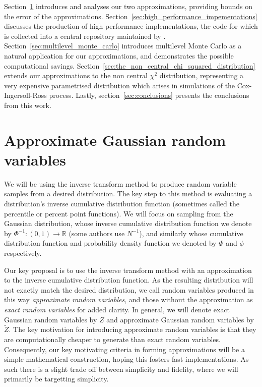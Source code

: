 \documentclass[manuscript,review]{acmart}
\begin{document}
Section~\ref{sec:approximate_gaussian_random_variables} introduces and analyses our two approximations, providing bounds on the error of the approximations. Section~\ref{sec:high_performance_impementations} discusses the production of high performance implementations, the code for which is collected into a central repository maintained by \citet{sheridan2020approximate_random,sheridan2020approximate_inverse}. Section~\ref{sec:multilevel_monte_carlo} introduces multilevel Monte Carlo as a natural application for our approximations, and demonstrates the possible computational savings. Section~\ref{sec:the_non_central_chi_squared_distribution} extends our approximations to the non central $ \chi^2 $ distribution, representing a very expensive parametrised distribution which arises in simulations of the Cox-Ingersoll-Ross process. Lastly, section~\ref{sec:conclusions} presents the conclusions from this work. 

\section{Approximate Gaussian random variables}
\label{sec:approximate_gaussian_random_variables}

We will be using the inverse transform method \citep[2.2.1]{glasserman2013monte} to produce random variable samples from a desired distribution. The key step to this method is evaluating a distribution's inverse cumulative distribution function (sometimes called the percentile or percent point functions). We will focus on sampling from the Gaussian distribution, whose inverse cumulative distribution function we denote by $ \Phi^{-1} \colon (0, 1) \to \mathbb{R} $ (some authors use $ N^{-1} $), and similarly whose cumulative distribution function and probability density function we denoted by $ \Phi $ and $ \phi $ respectively. 

Our key proposal is to use the inverse transform method with an approximation to the inverse cumulative distribution function. As the resulting distribution will not exactly match the desired distribution, we call random variables produced in this way \emph{approximate random variables}, and those without the approximation as \emph{exact random variables} for added clarity. In general, we will denote exact Gaussian random variables by $ Z $ and approximate Gaussian random variables by $ \tilde{Z} $. The key motivation for introducing approximate random variables is that they are computationally cheaper to generate than exact random variables. Consequently, our key motivating criteria in forming approximations will be a simple mathematical construction, hoping this fosters fast implementations. As such there is a slight trade off between simplicity and fidelity, where we will primarily be targetting simplicity. 
\end{document}

